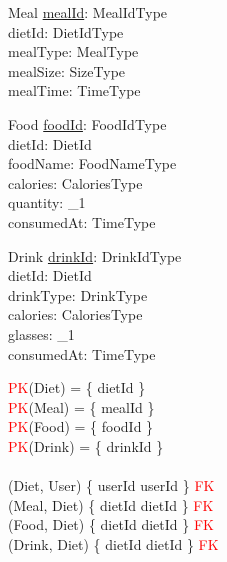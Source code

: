 \documentclass{article}
\begin{document}
\vspace{-0.75cm}
\begin{schema}{Meal}
	\underline{mealId}: MealIdType \\
  dietId: DietIdType \\
  mealType: MealType \\
  mealSize: SizeType \\
  mealTime: TimeType \\
\end{schema}
\vspace{-0.75cm}
\begin{schema}{Food}
	\underline{foodId}: FoodIdType \\
  dietId: DietId \\
  foodName: FoodNameType \\
  calories: CaloriesType \\
  quantity: \nat_1 \\
  consumedAt: TimeType \\
\end{schema}
\vspace{-0.75cm}
\begin{schema}{Drink}
	\underline{drinkId}: DrinkIdType \\
  dietId: DietId \\
  drinkType: DrinkType \\
  calories: CaloriesType \\
  glasses: \nat_1 \\
  consumedAt: TimeType \\
\end{schema}
\begin{zed}
\textcolor{red}{PK}(Diet) = \{ dietId \} \\
\textcolor{red}{PK}(Meal) = \{ mealId \} \\
\textcolor{red}{PK}(Food) = \{ foodId \} \\
\textcolor{red}{PK}(Drink) = \{ drinkId \} \\
\newline \\ 
(Diet, User) \mapsto \{ userId \mapsto userId \} \in \textcolor{red}{FK} \\
(Meal, Diet) \mapsto \{ dietId \mapsto dietId \} \in \textcolor{red}{FK} \\
(Food, Diet) \mapsto \{ dietId \mapsto dietId \} \in \textcolor{red}{FK} \\
(Drink, Diet) \mapsto \{ dietId \mapsto dietId \} \in \textcolor{red}{FK} \\
\end{zed}
\end{document}
